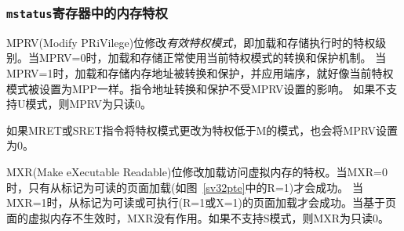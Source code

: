 \subsubsection{{\tt mstatus}寄存器中的内存特权}

\iffalse
The MPRV (Modify PRiVilege) bit modifies the {\em effective privilege mode},
i.e., the privilege level at which loads
and stores execute.  When MPRV=0, loads and stores
behave as normal, using the translation and protection mechanisms of the
current privilege mode.
When MPRV=1, load and store memory addresses are translated and protected, and
endianness is applied, as though the current privilege mode were set to MPP.
Instruction address-translation and protection are unaffected by the setting
of MPRV.  MPRV is read-only 0 if U-mode is not supported.

An MRET or SRET instruction that changes the privilege mode to a mode
less privileged than M also sets MPRV=0.

The MXR (Make eXecutable Readable) bit modifies the privilege with which loads
access virtual memory.  When MXR=0, only loads from pages marked readable (R=1
in Figure~\ref{sv32pte}) will succeed.  When MXR=1, loads from pages marked
either readable or executable (R=1 or X=1) will succeed.  MXR has no effect
when page-based virtual memory is not in effect.  MXR is read-only 0 if
S-mode is not supported.
\fi

MPRV(Modify PRiVilege)位修改{\em 有效特权模式}，即加载和存储执行时的特权级别。当MPRV=0时，加载和存储正常使用当前特权模式的转换和保护机制。
当MPRV=1时，加载和存储内存地址被转换和保护，并应用端序，就好像当前特权模式被设置为MPP一样。指令地址转换和保护不受MPRV设置的影响。
如果不支持U模式，则MPRV为只读0。

如果MRET或SRET指令将特权模式更改为特权低于M的模式，也会将MPRV设置为0。

MXR(Make eXecutable Readable)位修改加载访问虚拟内存的特权。当MXR=0时，只有从标记为可读的页面加载(如图~\ref{sv32pte}中的R=1)才会成功。
当MXR=1时，从标记为可读或可执行(R=1或X=1)的页面加载才会成功。当基于页面的虚拟内存不生效时，MXR没有作用。如果不支持S模式，则MXR为只读0。

\iffalse
\begin{commentary}
The MPRV and MXR mechanisms were conceived to improve the efficiency of M-mode
routines that emulate missing hardware features, e.g., misaligned loads and
stores.  MPRV obviates the need to perform address translation in software.
MXR allows instruction words to be loaded from pages marked execute-only.

The current privilege mode and the privilege mode specified by MPP might have
different XLEN settings.  When MPRV=1, load and store memory addresses are
treated as though the current XLEN were set to MPP's XLEN, following the rules
in Section~\ref{xlen-control}.
\end{commentary}
\fi

